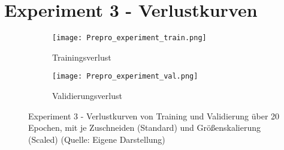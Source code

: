 \chapter{Experiment 3 - Verlustkurven}
\label{appendix:Experiment3Verlustkurven}
\begin{figure}[!ht]
	\centering
	\begin{subfigure}[b]{0.8\textwidth}
		\centering
		\texttt{[image: Prepro\_experiment\_train.png]}
		\caption{Trainingsverlust}
		\label{fig:ex3_prepro_train}
	\end{subfigure}
	\vfil
	\begin{subfigure}[b]{0.8\linewidth}
		\centering
		\texttt{[image: Prepro\_experiment\_val.png]}
		\caption{Validierungsverlust}
		\label{fig:ex3_prepro_val}
	\end{subfigure}
	\caption{Experiment 3 - Verlustkurven von Training und Validierung über 20 Epochen, mit je Zuschneiden (Standard) und Größenskalierung (Scaled) (Quelle: Eigene Darstellung)}
\end{figure} 